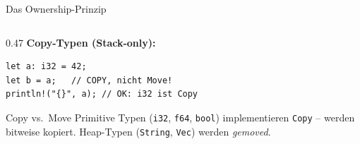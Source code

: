 \documentclass[%
  aspectratio=169,
  10pt
]{beamer}
\begin{document}
\begin{frame}[fragile]{Das Ownership-Prinzip}
\begin{columns}[T]
\begin{column}{0.47\textwidth}
      \vspace{0.2em}
      \textbf{Copy-Typen (Stack-only):}
\begin{lstlisting}
let a: i32 = 42;
let b = a;   // COPY, nicht Move!
println!("{}", a); // OK: i32 ist Copy
\end{lstlisting}
      \begin{block}{Copy vs.\ Move}
        \small
        Primitive Typen (\texttt{i32}, \texttt{f64},
        \texttt{bool}) implementieren \texttt{Copy} --
        werden bitweise kopiert.
        Heap-Typen (\texttt{String}, \texttt{Vec})
        werden \emph{gemoved}.
      \end{block}
    \end{column}
  \end{columns}
\end{frame}
\end{document}
